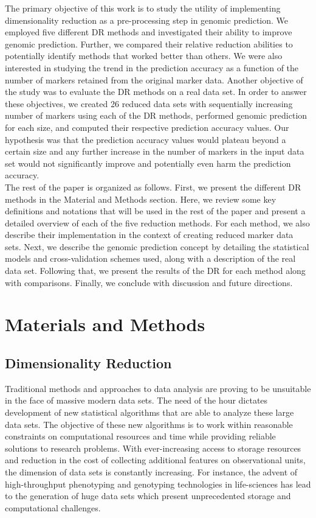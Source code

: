 The primary objective of this work is to study the  utility of implementing dimensionality reduction as a pre-processing step in genomic prediction. We employed five different DR methods and investigated their ability to improve genomic prediction. Further, we compared their relative reduction abilities to potentially identify methods that worked better than others. We were also interested in studying the trend in the prediction accuracy as a function of the number of markers retained from the original marker data. Another objective of the study was to evaluate the DR methods on a real data set. In order to answer these objectives, we created 26 reduced data sets with sequentially increasing number of markers using each of the DR methods, performed genomic prediction for each size, and computed their respective prediction accuracy values. Our hypothesis was that the prediction accuracy values would plateau beyond a certain size and any further increase in the number of markers in the input data set would not significantly improve and potentially even harm the prediction accuracy. \\

The rest of the paper is organized as follows. First, we present the different DR methods in the Material and Methods section. Here, we review some key definitions and notations that will be used in the rest of the paper and present a detailed overview of each of the five reduction methods. For each method, we also describe their implementation in the context of creating reduced marker data sets. Next, we describe the genomic prediction concept by detailing the statistical models and cross-validation schemes used, along with a description of the real data set. Following that, we present the results of the DR for each method along with comparisons. Finally, we conclude with discussion and future directions.  \\

\section{Materials and Methods}
\subsection{Dimensionality Reduction}

Traditional methods and approaches to data analysis are proving to be unsuitable in the face of massive modern data sets. The need of the hour dictates development of new statistical algorithms that are able to analyze these large data sets. The objective of these new algorithms is to work within reasonable constraints on computational resources and time while providing reliable solutions to research problems. With ever-increasing access to storage resources and reduction in the cost of collecting additional features on observational units, the dimension of data sets is constantly increasing. For instance, the advent of high-throughput phenotyping and genotyping technologies in life-sciences has lead to the generation of huge data sets which present unprecedented storage and computational challenges. \\

